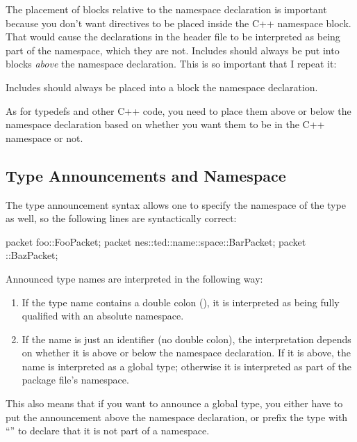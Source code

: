 The placement of  blocks relative to the namespace
declaration is important because you don't want  directives
to be placed inside the C++ namespace block. That would cause the
declarations in the header file to be interpreted as being part of the
namespace, which they are not. Includes should always be put into
 blocks \textit{above} the namespace declaration. This is so
important that I repeat it:

\begin{important}
Includes should always be placed into a  block 
the namespace declaration.
\end{important}

As for typedefs and other C++ code, you need to place them above or below
the namespace declaration based on whether you want them to be in the C++
namespace or not.

\subsection{Type Announcements and Namespace}
\label{sec:msg-def:type-announcements-and-namespace}

The type announcement syntax allows one to specify the namespace of the type
as well, so the following lines are syntactically correct:

\begin{msg}
packet foo::FooPacket;
packet nes::ted::name::space::BarPacket;
packet ::BazPacket;
\end{msg}

Announced type names are interpreted in the following way:

\begin{enumerate}
\item If the type name contains a double colon (\ttt{::}), it is interpreted
      as being fully qualified with an absolute namespace.
\item If the name is just an identifier (no double colon), the interpretation
      depends on whether it is above or below the namespace declaration.
      If it is above, the name is interpreted as a global type; otherwise
      it is interpreted as part of the package file's namespace.
\end{enumerate}

This also means that if you want to announce a global type, you either
have to put the announcement above the namespace declaration, or prefix
the type with ``\ttt{::}'' to declare that it is not part of a namespace.

